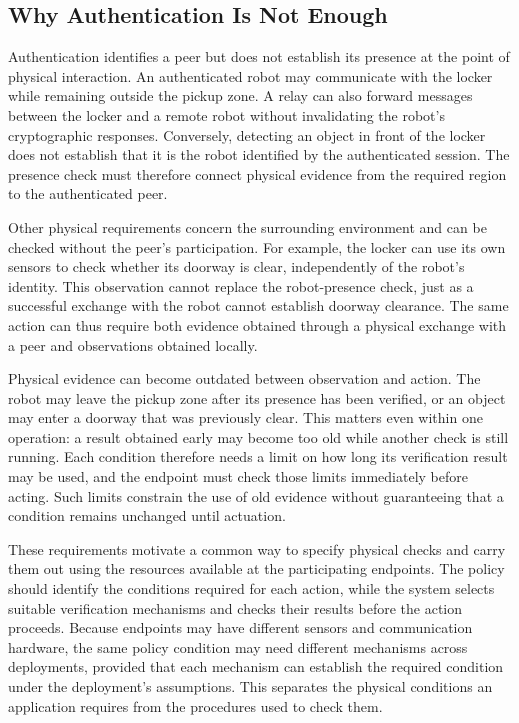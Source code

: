 \documentclass[sigconf,authordraft]{acmart}
\begin{document}
\subsection{Why Authentication Is Not Enough}

Authentication identifies a peer but does not establish its presence at the point of physical interaction.
An authenticated robot may communicate with the locker while remaining outside the pickup zone.
A relay can also forward messages between the locker and a remote robot without invalidating the robot's cryptographic responses.
Conversely, detecting an object in front of the locker does not establish that it is the robot identified by the authenticated session.
The presence check must therefore connect physical evidence from the required region to the authenticated peer.

Other physical requirements concern the surrounding environment and can be checked without the peer's participation.
For example, the locker can use its own sensors to check whether its doorway is clear, independently of the robot's identity.
This observation cannot replace the robot-presence check, just as a successful exchange with the robot cannot establish doorway clearance.
The same action can thus require both evidence obtained through a physical exchange with a peer and observations obtained locally.

Physical evidence can become outdated between observation and action.
The robot may leave the pickup zone after its presence has been verified, or an object may enter a doorway that was previously clear.
This matters even within one operation: a result obtained early may become too old while another check is still running.
Each condition therefore needs a limit on how long its verification result may be used, and the endpoint must check those limits immediately before acting.
Such limits constrain the use of old evidence without guaranteeing that a condition remains unchanged until actuation.

These requirements motivate a common way to specify physical checks and carry them out using the resources available at the participating endpoints.
The policy should identify the conditions required for each action, while the system selects suitable verification mechanisms and checks their results before the action proceeds.
Because endpoints may have different sensors and communication hardware, the same policy condition may need different mechanisms across deployments, provided that each mechanism can establish the required condition under the deployment's assumptions.
This separates the physical conditions an application requires from the procedures used to check them.
\end{document}
